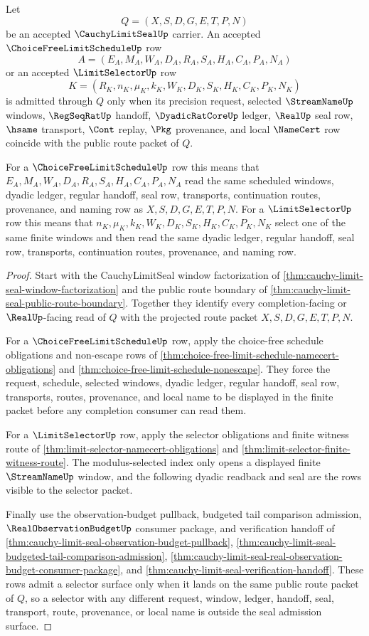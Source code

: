 \begin{theorem}
\label{thm:cauchy-limit-seal-choice-free-selector-admission}
Let
$$
Q=(X,S,D,G,E,T,P,N)
$$
be an accepted $\CauchyLimitSealUp$ carrier. An accepted $\ChoiceFreeLimitScheduleUp$ row
$$
A=(E_A,M_A,W_A,D_A,R_A,S_A,H_A,C_A,P_A,N_A)
$$
or an accepted $\LimitSelectorUp$ row
$$
K=(R_K,n_K,\mu_K,k_K,W_K,D_K,S_K,H_K,C_K,P_K,N_K)
$$
is admitted through $Q$ only when its precision request, selected $\StreamNameUp$ windows, $\RegSeqRatUp$ handoff, $\DyadicRatCoreUp$ ledger, $\RealUp$ seal row, $\hsame$ transport, $\Cont$ replay, $\Pkg$ provenance, and local $\NameCert$ row coincide with the public route packet of $Q$.

For a $\ChoiceFreeLimitScheduleUp$ row this means that $E_A,M_A,W_A,D_A,R_A,S_A,H_A,C_A,P_A,N_A$ read the same scheduled windows, dyadic ledger, regular handoff, seal row, transports, continuation routes, provenance, and naming row as $X,S,D,G,E,T,P,N$. For a $\LimitSelectorUp$ row this means that $n_K,\mu_K,k_K,W_K,D_K,S_K,H_K,C_K,P_K,N_K$ select one of the same finite windows and then read the same dyadic ledger, regular handoff, seal row, transports, continuation routes, provenance, and naming row.
\end{theorem}
\begin{proof}
Start with the CauchyLimitSeal window factorization of \autoref{thm:cauchy-limit-seal-window-factorization} and the public route boundary of \autoref{thm:cauchy-limit-seal-public-route-boundary}. Together they identify every completion-facing or $\RealUp$-facing read of $Q$ with the projected route packet $X,S,D,G,E,T,P,N$.

For a $\ChoiceFreeLimitScheduleUp$ row, apply the choice-free schedule obligations and non-escape rows of \autoref{thm:choice-free-limit-schedule-namecert-obligations} and \autoref{thm:choice-free-limit-schedule-nonescape}. They force the request, schedule, selected windows, dyadic ledger, regular handoff, seal row, transports, routes, provenance, and local name to be displayed in the finite packet before any completion consumer can read them.

For a $\LimitSelectorUp$ row, apply the selector obligations and finite witness route of \autoref{thm:limit-selector-namecert-obligations} and \autoref{thm:limit-selector-finite-witness-route}. The modulus-selected index only opens a displayed finite $\StreamNameUp$ window, and the following dyadic readback and seal are the rows visible to the selector packet.

Finally use the observation-budget pullback, budgeted tail comparison admission, $\RealObservationBudgetUp$ consumer package, and verification handoff of \autoref{thm:cauchy-limit-seal-observation-budget-pullback}, \autoref{thm:cauchy-limit-seal-budgeted-tail-comparison-admission}, \autoref{thm:cauchy-limit-seal-real-observation-budget-consumer-package}, and \autoref{thm:cauchy-limit-seal-verification-handoff}. These rows admit a selector surface only when it lands on the same public route packet of $Q$, so a selector with any different request, window, ledger, handoff, seal, transport, route, provenance, or local name is outside the seal admission surface.
\end{proof}
